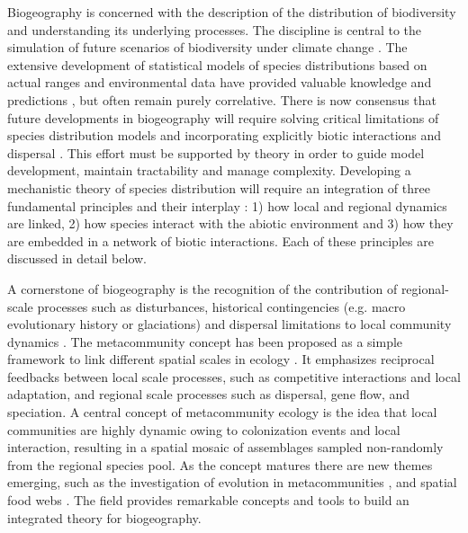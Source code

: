 Biogeography is concerned with the description of the distribution of biodiversity and understanding its underlying processes. The discipline is central to the simulation of future scenarios of biodiversity under climate change \citep{Thuiller2013Road}. The extensive development of statistical models of species distributions based on actual ranges and environmental data have provided valuable knowledge and predictions \citep{Kearney2004Mapping}, but often remain purely correlative. There is now consensus that future developments in biogeography will require solving critical limitations of species distribution models \citep{Kissling2012Towards} and incorporating explicitly biotic interactions and dispersal \citep{Lavergne2010Biodiversity}. This effort must be supported by theory in order to guide model development, maintain tractability and manage complexity. Developing a mechanistic theory of species distribution will require an integration of three fundamental principles and their interplay \citep{Thuiller2013Road}: 1) how local and regional dynamics are linked, 2) how species interact with the abiotic environment and 3) how they are embedded in a network of biotic interactions. Each of these principles are discussed in detail below.

A cornerstone of biogeography is the recognition of the contribution of regional-scale processes such as disturbances, historical contingencies (e.g. macro evolutionary history or glaciations) and dispersal limitations to local community dynamics \citep{Ricklefs1987Community}. The metacommunity concept has been proposed as a simple framework to link different spatial scales in ecology \citep{Leibold2004Metacommunity}. It emphasizes reciprocal feedbacks between local scale processes, such as competitive interactions and local adaptation, and regional scale processes such as dispersal, gene flow, and speciation. A central concept of metacommunity ecology is the idea that local communities are highly dynamic owing to colonization events and local interaction, resulting in a spatial mosaic of assemblages sampled non-randomly from the regional species pool. As the concept matures there are new themes emerging, such as the investigation of evolution in metacommunities \citep{Urban2008Evolutionary}, and spatial food webs \citep{Massol2011Linking,Gravel2011Trophic}. The field provides remarkable concepts and tools to build an integrated theory for biogeography.

